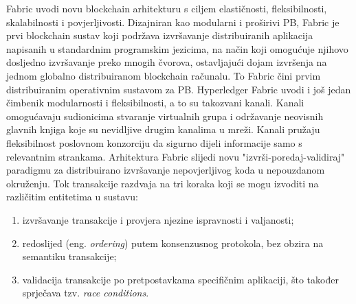 \documentclass[times, utf8, diplomski]{fer}
\begin{document}
Fabric uvodi novu blockchain arhitekturu s ciljem elastičnosti, fleksibilnosti, skalabilnosti i povjerljivosti. Dizajniran kao modularni i proširivi PB, Fabric je prvi blockchain sustav koji podržava izvršavanje distribuiranih aplikacija napisanih u standardnim programskim jezicima, na način koji omogućuje njihovo dosljedno izvršavanje preko mnogih čvorova, ostavljajući dojam izvršenja na jednom globalno distribuiranom blockchain
računalu. To Fabric čini prvim distribuiranim operativnim sustavom za PB.
Hyperledger Fabric uvodi i još jedan čimbenik modularnosti i fleksibilnosti, a to su takozvani kanali. Kanali omogućavaju sudionicima stvaranje virtualnih grupa i održavanje neovisnih glavnih knjiga koje su nevidljive drugim kanalima u mreži. Kanali pružaju fleksibilnost poslovnom konzorciju da sigurno dijeli informacije samo s relevantnim strankama.
Arhitektura Fabric slijedi novu "izvrši-poredaj-validiraj" paradigmu za distribuirano izvršavanje nepovjerljivog koda u nepouzdanom okruženju. Tok transakcije razdvaja na tri koraka koji se mogu izvoditi na različitim entitetima u sustavu:

\begin{enumerate}

\item izvršavanje transakcije i provjera njezine ispravnosti i valjanosti;

\item redoslijed (eng.  \textit{ordering}) putem konsenzusnog protokola, bez obzira na semantiku transakcije;

\item validacija transakcije po pretpostavkama specifičnim aplikaciji, što također sprječava tzv.  \textit{race conditions}.

\end{enumerate}
\end{document}
